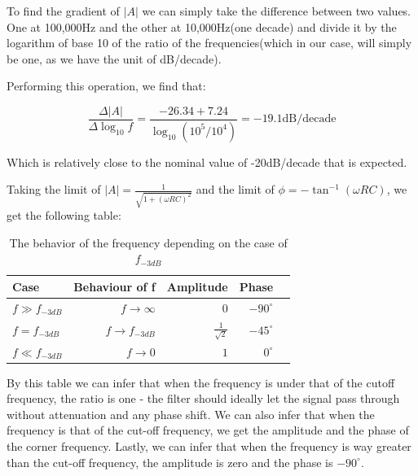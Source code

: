 To find the gradient of $|A|$ we can simply take the difference between two values. One at 100,000Hz and the other at 10,000Hz(one decade) and divide it by the logarithm of base 10 of the ratio of the frequencies(which in our case, will simply be one, as we have the unit of dB/decade).


Performing this operation, we find that:


\begin{equation}
    \frac{\Delta |A|}{\Delta \log_{10}f} = \frac{- 26.34 + 7.24}{\log_{10}(10^5/10^4)} = -19.1\text{dB/decade}
\end{equation}

Which is relatively close to the nominal value of -20dB/decade that is expected.

\break
Taking the limit of $|A| = \frac{1}{\sqrt{1+(\omega RC)^2}}$ and the limit of $\phi = -\tan^{-1}(\omega RC)$, we get the following table:

\begin{table}[!htp]\centering
    \scriptsize
    \begin{tabular}{lrrrr}\toprule
        Case             & Behaviour of f   & Amplitude            & Phase         \\\midrule
        $f \gg f_{-3dB}$ & $f \to \infty$   & $0$                  & $-90^{\circ}$ \\
        $f = f_{-3dB}$   & $f \to f_{-3dB}$ & $\frac{1}{\sqrt{2}}$ & $-45^{\circ}$ \\
        $f \ll f_{-3dB}$ & $f \to 0$        & $1$                  & $0^{\circ}$   \\
        \bottomrule
    \end{tabular}
    \caption{The behavior of the frequency depending on the case of $f_{-3dB}$}\label{tab: }
\end{table}
By this table we can infer that when the frequency is under that of the cutoff frequency, the ratio is one - the filter should ideally let the signal pass through without attenuation and any phase shift.
We can also infer that when the frequency is that of the cut-off frequency, we get the amplitude and the phase of the corner frequency.
Lastly, we can infer that when the frequency is way greater than the cut-off frequency, the amplitude is zero and the phase is $-90^{\circ}$.